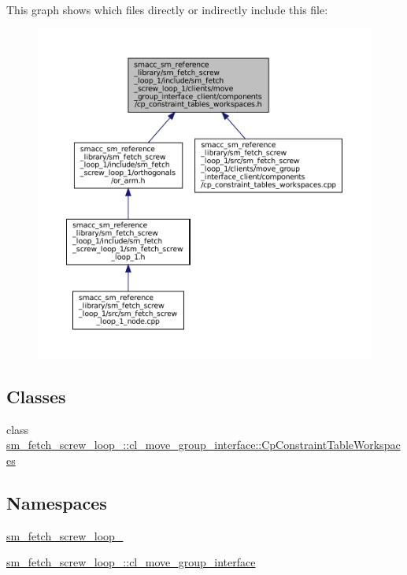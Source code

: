 This graph shows which files directly or indirectly include this file\+:
\nopagebreak
\begin{figure}[H]
\begin{center}
\leavevmode
\includegraphics[width=350pt]{sm__fetch__screw__loop__1_2include_2sm__fetch__screw__loop__1_2clients_2move__group__interface__3a343b59216a7fb7d5581e1651a64b79}
\end{center}
\end{figure}
\subsection*{Classes}
\begin{DoxyCompactItemize}
\item 
class \hyperlink{classsm__fetch__screw__loop__1_1_1cl__move__group__interface_1_1CpConstraintTableWorkspaces}{sm\+\_\+fetch\+\_\+screw\+\_\+loop\+\_\+::cl\+\_\+move\+\_\+group\+\_\+interface\+::\+Cp\+Constraint\+Table\+Workspaces}
\end{DoxyCompactItemize}
\subsection*{Namespaces}
\begin{DoxyCompactItemize}
\item 
 \hyperlink{namespacesm__fetch__screw__loop__1}{sm\+\_\+fetch\+\_\+screw\+\_\+loop\+\_}
\item 
 \hyperlink{namespacesm__fetch__screw__loop__1_1_1cl__move__group__interface}{sm\+\_\+fetch\+\_\+screw\+\_\+loop\+\_\+::cl\+\_\+move\+\_\+group\+\_\+interface}
\end{DoxyCompactItemize}
